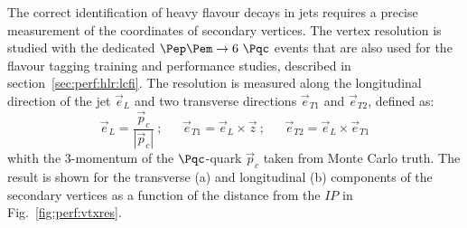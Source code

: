 The correct identification of heavy flavour decays in jets requires a precise measurement of the coordinates of secondary vertices.
The vertex resolution is studied with the dedicated $\Pep\Pem \rightarrow 6~\Pqc$ events that are also used for the flavour tagging
training and performance studies, described in section~\ref{sec:perf:hlr:lcfi}.
%
The resolution is measured along the longitudinal direction of the jet $\vec{e}_L$
and two transverse directions $\vec{e}_{T1}$ and $\vec{e}_{T2}$, defined as:
%
\begin{equation}
\vec{e}_L = \frac{ \vec{p}_c }{|\vec{p}_c| }~; ~~~~~~~  \vec{e}_{T1} = \vec{e}_L \times \vec{z} ~; ~~~~~~~  \vec{e}_{T2} = \vec{e}_L \times \vec{e}_{T1}
\end{equation}
whith the 3-momentum of the $\Pqc$-quark $\vec{p}_c$ taken from Monte Carlo truth.
The result is shown for the transverse (a) and longitudinal (b) components of the secondary vertices as a function of the distance from the $IP$
in Fig.~\ref{fig:perf:vtxres}.
